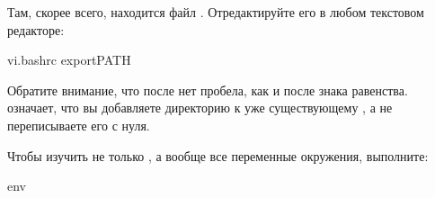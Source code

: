 \documentclass[letterpaper,10pt,russian]{sphinxmanual}
\begin{document}
\sphinxAtStartPar
Там, скорее всего, находится файл . Отредактируйте его в любом текстовом редакторе:

\begin{sphinxVerbatim}[commandchars=\\\{\}]
vi.bashrc
exportPATH
\end{sphinxVerbatim}

\sphinxAtStartPar
Обратите внимание, что после  нет пробела, как и после знака равенства.
 означает, что вы добавляете директорию  к уже существующему , а не переписываете его с нуля.

\sphinxAtStartPar
{}
Чтобы изучить не только , а вообще все переменные окружения, выполните:

\begin{sphinxVerbatim}[commandchars=\\\{\}]
env
\end{sphinxVerbatim}
\end{document}
